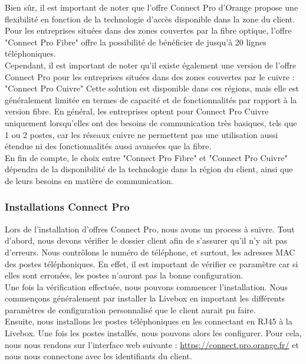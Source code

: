 \documentclass[12pt, a4paper]{article}
\begin{document}
Bien sûr, il est important de noter que l'offre
Connect Pro d'Orange propose une flexibilité en
fonction de la technologie d'accès disponible dans
la zone du client. Pour les entreprises situées dans des
zones couvertes par la fibre optique, l'offre
"Connect Pro Fibre" offre la possibilité de
bénéficier de jusqu'à 20 lignes téléphoniques.\\

Cependant, il est important de noter qu'il
existe également une version de l'offre Connect Pro
pour les entreprises situées dans des zones
couvertes par le cuivre : "Connect Pro Cuivre"
Cette solution est disponible dans ces régions, mais elle est
généralement limitée en termes de capacité et de
fonctionnalités par rapport à la version fibre.
En général, les entreprises optent pour
Connect Pro Cuivre uniquement lorsqu'elles ont
des besoins de communication très basiques, tels
que 1 ou 2 postes, car les réseaux
cuivre ne permettent pas une utilisation aussi
étendue ni des fonctionnalités aussi avancées 
que la fibre.\\

En fin de compte, le choix entre "Connect Pro
Fibre" et "Connect Pro Cuivre" dépendra de la
disponibilité de la technologie dans la région du client,
ainsi que de leurs besoins en matière de communication.
\par\endgroup

\newpage
\subsubsection{Installations Connect Pro}
Lors de l'installation d'offres Connect Pro, nous
avons un process à suivre. Tout d'abord, nous devons
vérifier le dossier client afin de s'assurer 
qu'il n'y ait pas d'erreurs. Nous contrôlons 
le numéro de téléphone, et surtout, les adresses 
MAC des postes téléphoniques. En effet, il est
important de vérifier ce paramètre car si elles 
sont erronées, les postes n'auront pas 
la bonne configuration.\\

Une fois la vérification effectuée, nous pouvons
commencer l'installation. Nous commençons généralement 
par installer la Livebox en important les différents 
paramètres de configuration personnalisé que le client 
aurait pu faire.\\

Ensuite, nous installons les postes téléphoniques
en les connectant en RJ45 à la Livebox. Une fois
les postes installés, nous pouvons alors les
configurer. Pour cela, nous nous rendons sur 
l'interface web suivante : \url{https://connect.pro.orange.fr/}
et nous nous connectons avec les identifiants
du client.\\
\end{document}
